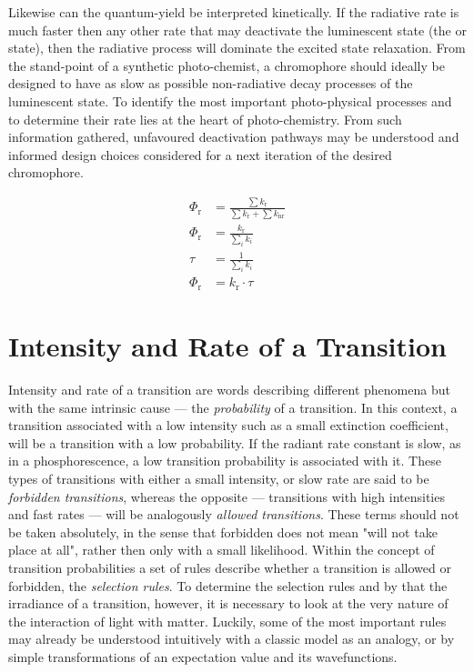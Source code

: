 			Likewise can the quantum-yield be interpreted kinetically. If the radiative rate is much faster then any other rate that may deactivate the luminescent state (the  or  state), then the radiative process will dominate the excited state relaxation. From the stand-point of a synthetic photo-chemist, a chromophore should ideally be designed to have as slow as possible non-radiative decay processes of the luminescent state. To identify the most important photo-physical processes and to determine their rate lies at the heart of photo-chemistry. From such information gathered, unfavoured deactivation pathways may be understood and informed design choices considered for a next iteration of the desired chromophore.

			\begin{equation}%
			\begin{split}
				\label{eq:QYkin}
		 		\Phi_\mathrm{r} &= \frac{\sum k_\mathrm{r}}{\sum k_\mathrm{r} + \sum k_\mathrm{nr}} \\
		 		\Phi_\mathrm{r} &= \frac{k_\mathrm{r}}{\sum_i k_i} \\
		 		\tau &= \frac{1}{\sum_i k_i} \\
		 		\Phi_\mathrm{r} &= k_\mathrm{r}\cdot\tau
		 	\end{split} 
			\end{equation}



	\section{Intensity and Rate of a Transition}
	\label{sec:laws}
	Intensity and rate of a transition are words describing different phenomena but with the same intrinsic cause --- the \emph{probability} of a transition. In this context, a transition associated with a low intensity such as a small extinction coefficient, will be a transition with a low probability. If the radiant rate constant is slow, as in a phosphorescence, a low transition probability is associated with it. These types of transitions with either a small intensity, or slow rate are said to be \emph{forbidden transitions}, whereas the opposite --- transitions with high intensities and fast rates --- will be analogously \emph{allowed transitions}. These terms should not be taken absolutely, in the sense that forbidden does not mean "will not take place at all", rather then only with a small likelihood. Within the concept of transition probabilities a set of rules describe whether a transition is allowed or forbidden, the \emph{selection rules}. To determine the selection rules and by that the irradiance of a transition, however, it is necessary to look at the very nature of the interaction of light with matter. Luckily, some of the most important rules may already be understood intuitively with a classic model as an analogy, or by simple transformations of an expectation value and its wavefunctions.

